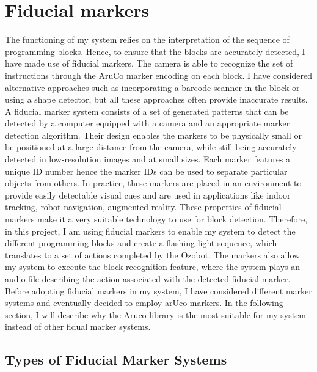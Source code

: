 \documentclass[oneside,%
                    author={Malak Hajji},
                    degree={BSc},
                    title={Designing An Accessible Computational Toolkit For Students},
                  subtitle={With Mixed Visual Abilities}]{dissertation}
\begin{document}
\section{Fiducial markers}
\noindent
The functioning of my system relies on the interpretation of the sequence of programming blocks. Hence, to ensure that the blocks are accurately detected, I have made use of fiducial markers. The camera is able to recognize the set of instructions through the AruCo marker encoding on each block. 
I have considered alternative approaches such as incorporating a barcode scanner in the block or using a shape detector, but all these approaches often provide inaccurate results. 
A fiducial marker system consists of a set of generated patterns that can be detected by a computer equipped with a camera and an appropriate marker detection algorithm.  Their design enables the markers to be physically small or be positioned at a large distance from the camera, while still being accurately detected in low-resolution images and at small sizes. Each marker features a unique ID number hence the marker IDs can be used to separate particular objects from others. In practice, these markers are placed in an environment to provide easily detectable visual cues and are used in applications like indoor tracking, robot navigation, augmented reality. These properties of fiducial markers make it a very suitable technology to use for block detection. 
Therefore, in this project, I am using fiducial markers to enable my system to detect the different programming blocks and create a flashing light sequence, which translates to a set of actions completed by the Ozobot. The markers also allow my system to execute the block recognition feature, where the system plays an audio file describing the action associated with the detected fiducial marker.  Before adopting fiducial markers in my system, I have considered different marker systems and eventually decided to employ arUco markers. In the following section, I will describe why the Aruco library is the most suitable for my system instead of other fidual marker systems.

\subsection{Types of Fiducial Marker Systems}
\end{document}
